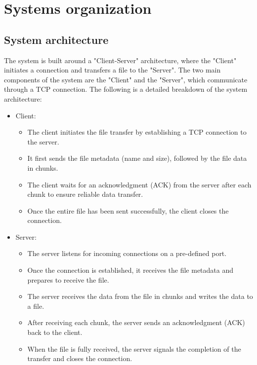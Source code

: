 \documentclass{article}
\begin{document}
\section{Systems organization}

\subsection{System architecture}
The system is built around a "Client-Server" architecture, where the "Client" initiates a connection and transfers a file to the "Server". The two main components of the system are the "Client" and the "Server", which communicate through a TCP connection. The following is a detailed breakdown of the system architecture:

\begin{itemize}
    \item Client: \begin{itemize}
        \item The client initiates the file transfer by establishing a TCP connection to the server.
        \item It first sends the file metadata (name and size), followed by the file data in chunks.
        \item The client waits for an acknowledgment (ACK) from the server after each chunk to ensure reliable data transfer.
        \item Once the entire file has been sent successfully, the client closes the connection.
    \end{itemize}

    \item Server: \begin{itemize}
        \item The server listens for incoming connections on a pre-defined port.
        \item Once the connection is established, it receives the file metadata and prepares to receive the file.
        \item The server receives the data from the file in chunks and writes the data to a file.
        \item After receiving each chunk, the server sends an acknowledgment (ACK) back to the client.
        \item When the file is fully received, the server signals the completion of the transfer and closes the connection.
    \end{itemize}
\end{itemize}
\end{document}
